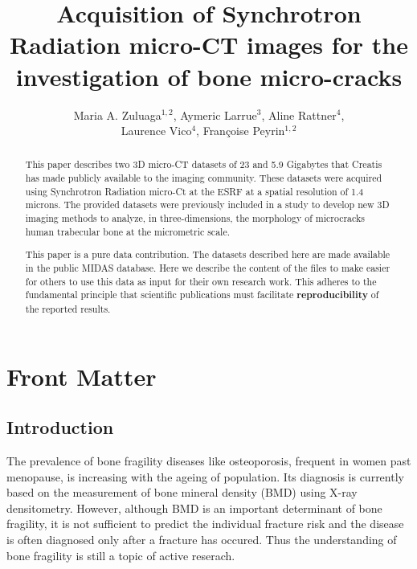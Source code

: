 \documentclass{InsightArticle}
\title{Acquisition of Synchrotron Radiation micro-CT images for the investigation of bone
micro-cracks}
\author{Maria A. Zuluaga$^{1,2}$, Aymeric Larrue$^{3}$, Aline Rattner$^{4}$, \\Laurence Vico$^{4}$, Fran\c{c}oise Peyrin$^{1,2}$}
\newcommand{\IJhandlerIDnumber}{3261}
\begin{document}
%
%
\IJhandlefooter{\IJhandlerIDnumber}


\ifpdf
\else
\fi


\maketitle


\ifhtml
\chapter*{Front Matter\label{front}}
\fi


\begin{abstract}
\noindent
This paper describes two 3D micro-CT datasets of 23 and 5.9 Gigabytes that Creatis has made
publicly available to the imaging community. These datasets were acquired using
Synchrotron Radiation micro-Ct at the ESRF at a spatial resolution of 1.4 microns.
The provided datasets were previously included in a study to develop
new 3D imaging methods to analyze, in three-dimensions, the morphology of microcracks
human trabecular bone at the micrometric scale.

This paper is a pure data contribution. The datasets described here are
made available in the public MIDAS database. Here we describe the content of
the files to make easier for others to use this data as input for their own
research work.  This adheres to the fundamental principle that scientific
publications must facilitate \textbf{reproducibility} of the reported results.
\end{abstract}

\tableofcontents

\section{Introduction}

The prevalence of bone fragility diseases like osteoporosis, frequent in women past menopause, is
increasing with the ageing of population. Its diagnosis is currently based on the measurement of
bone mineral density (BMD) using X-ray densitometry. However, although BMD is an important determinant
of bone fragility, it is not sufficient to predict the individual fracture risk and the disease is
often diagnosed only after a fracture has occured. Thus the understanding of bone fragility is still
a topic of active reserach.
\end{document}
